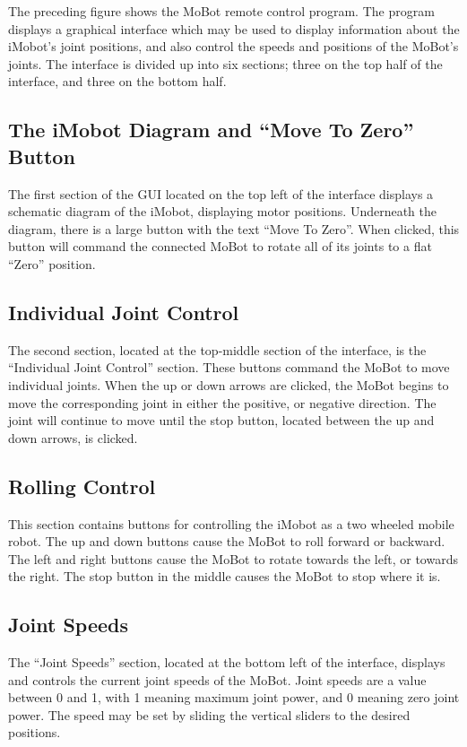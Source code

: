 \documentclass{article}
\begin{document}
The preceding figure shows the MoBot remote control program. The
program displays a graphical interface which may be used to display
information about the iMobot's joint positions, and also control the
speeds and positions of the MoBot's joints. The interface is divided
up into six sections; three on the top half of the interface, and three on 
the bottom half. 

\subsection{The iMobot Diagram and ``Move To Zero'' Button}
The first section of the GUI located on the top left of the interface
displays a schematic diagram of the iMobot, displaying motor positions.
Underneath the diagram, there is a large button with the text 
``Move To Zero''. When clicked, this button will command the connected
MoBot to rotate all of its joints to a flat ``Zero'' position.

\subsection{Individual Joint Control}
The second section, located at the top-middle section of the interface,
is the ``Individual Joint Control'' section. These buttons command the
MoBot to move individual joints. When the up or down arrows are clicked,
the MoBot begins to move the corresponding joint in either the positive,
or negative direction. The joint will continue to move until the stop 
button, located between the up and down arrows, is clicked. 

\subsection{Rolling Control}
This section contains buttons for controlling the iMobot as a 
two wheeled mobile robot. The up and down buttons cause the MoBot to
roll forward or backward. The left and right buttons cause the MoBot 
to rotate towards the left, or towards the right. The stop button in the
middle causes the MoBot to stop where it is.

\subsection{Joint Speeds}
The ``Joint Speeds'' section, located at the bottom left of the interface,
displays and controls the current joint speeds of the MoBot. Joint speeds
are a value between 0 and 1, with 1 meaning maximum joint power, and 0
meaning zero joint power. The speed may be set by sliding the vertical 
sliders to the desired positions. 
\end{document}
